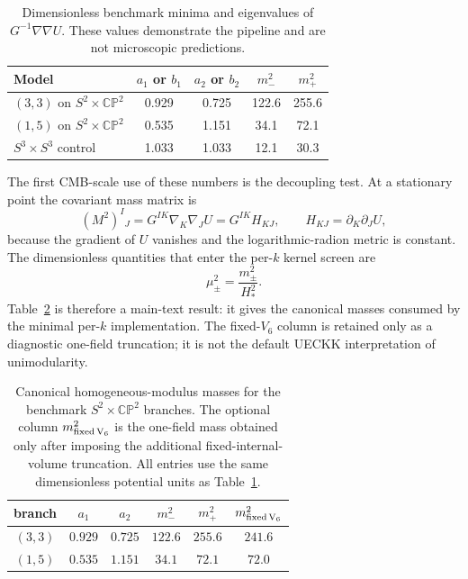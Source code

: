 \documentclass[11pt,a4paper]{article}
\newcommand{\CP}{\mathbb{CP}}
\begin{document}
\begin{table}[tbp]
\caption{Dimensionless benchmark minima and eigenvalues of $G^{-1}\nabla\nabla U$. These values demonstrate the pipeline and are not microscopic predictions.}
\label{tab:benchmarknumbers}
\begin{tabular}{lcccc}
Model & $a_1$ or $b_1$ & $a_2$ or $b_2$ & $m_-^2$ & $m_+^2$\\
\hline
$(3,3)$ on $S^2\times\CP^2$ & 0.929 & 0.725 & 122.6 & 255.6\\
$(1,5)$ on $S^2\times\CP^2$ & 0.535 & 1.151 & 34.1 & 72.1\\
$S^3\times S^3$ control & 1.033 & 1.033 & 12.1 & 30.3\\
\end{tabular}
\end{table}

The first CMB-scale use of these numbers is the decoupling test. At a stationary point the covariant mass matrix is
\begin{equation}
(M^2)^I{}_{J}=G^{IK}\nabla_K\nabla_JU=G^{IK}H_{KJ},
\qquad H_{KJ}=\partial_K\partial_JU,
\label{eq:maincanonicalmass}
\end{equation}
because the gradient of $U$ vanishes and the logarithmic-radion metric is constant. The dimensionless quantities that enter the per-$k$ kernel screen are
\begin{equation}
\mu_\pm^2=\frac{m_\pm^2}{H_*^2}.
\label{eq:mainmuratios}
\end{equation}
Table~\ref{tab:canonicalmasses} is therefore a main-text result: it gives the canonical masses consumed by the minimal per-$k$ implementation. The fixed-$V_6$ column is retained only as a diagnostic one-field truncation; it is not the default UECKK interpretation of unimodularity.

\begin{table}[tbp]
\caption{Canonical homogeneous-modulus masses for the benchmark $S^2\times\CP^2$ branches. The optional column $m_{\rm fixed\,V_6}^2$ is the one-field mass obtained only after imposing the additional fixed-internal-volume truncation. All entries use the same dimensionless potential units as Table~\ref{tab:benchmarknumbers}.}
\label{tab:canonicalmasses}
\begin{tabular}{c c c c c c}
branch & $a_1$ & $a_2$ & $m_-^2$ & $m_+^2$ & $m_{\rm fixed\,V_6}^2$\\
\hline
$(3,3)$ & $0.929$ & $0.725$ & $122.6$ & $255.6$ & $241.6$\\
$(1,5)$ & $0.535$ & $1.151$ & $34.1$ & $72.1$ & $72.0$
\end{tabular}
\end{table}
\end{document}

